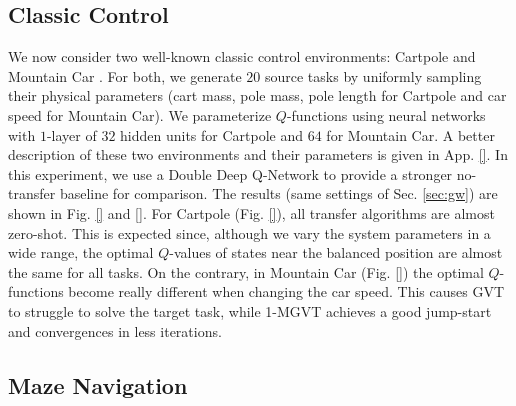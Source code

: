 \documentclass{article}
\begin{document}
\subsection{Classic Control} \label{sec:cc}

We now consider two well-known classic control environments: Cartpole and Mountain Car \citep{sutton1998reinforcement}. For both, we generate $20$ source tasks by uniformly sampling their physical parameters (cart mass, pole mass, pole length for Cartpole and car speed for Mountain Car). We parameterize $Q$-functions using neural networks with $1$-layer of $32$ hidden units for Cartpole and $64$ for Mountain Car. A better description of these two environments and their parameters is given in App. \ref{}. In this experiment, we use a Double Deep Q-Network \cite{van2016deep} to provide a stronger no-transfer baseline for comparison. The results (same settings of Sec. \ref{sec:gw}) are shown in Fig. \ref{} and \ref{}. For Cartpole (Fig. \ref{}), all transfer algorithms are almost zero-shot. This is expected since, although we vary the system parameters in a wide range, the optimal $Q$-values of states near the balanced position are almost the same for all tasks. On the contrary, in Mountain Car (Fig. \ref{}) the optimal $Q$-functions become really different when changing the car speed. This causes GVT to struggle to solve the target task, while 1-MGVT achieves a good jump-start and convergences in less iterations.

\subsection{Maze Navigation} \label{sec:mn}
\end{document}

